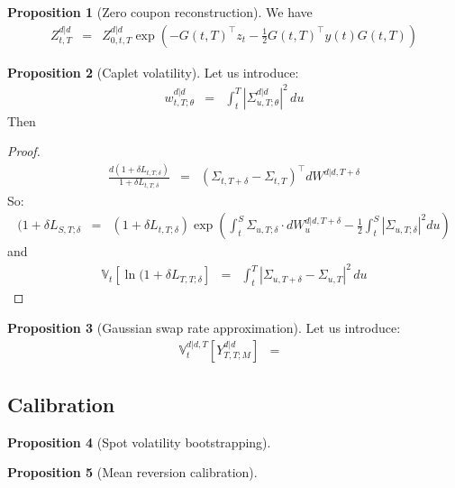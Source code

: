 \documentclass[11pt,english]{amsart}
\newcommand{\VV}{\mathbb{V}}
\theoremstyle{definition}
\newtheorem{prop}{Proposition}
\begin{document}
\begin{prop}[Zero coupon reconstruction]
We have
\begin{eqnarray}
	Z^{d|d}_{t,T} &=& Z^{d|d}_{0,t,T} \exp\left( - G(t,T)^\top z_t - \frac{1}{2} G(t,T)^\top y(t) G(t,T) \right)
\end{eqnarray}
\end{prop}

\begin{prop}[Caplet volatility]
Let us introduce:
\begin{eqnarray}
  w^{d|d}_{t,T;\theta} &=& \int_t^T \left| \Sigma^{d|d}_{u,T;\theta}  \right|^2\, du
\end{eqnarray}
Then 
\end{prop}

\begin{proof}
\begin{eqnarray}
	\frac{d(1+\delta L_{t,T;\delta})}{1+\delta L_{t,T;\delta}} 
	&=& \left( \Sigma_{t,T+\delta} - \Sigma_{t,T} \right)^\top dW^{d|d,T+\delta} 
\end{eqnarray}
So:
\begin{eqnarray}
  (1+\delta L_{S,T;\delta} 
  &=& (1+\delta L_{t,T;\delta})\exp\left( \int_t^S   \Sigma_{u,T;\delta} \cdot  dW^{d|d,T+\delta}_u  - \frac{1}{2} \int_t^S \left| \Sigma_{u,T;\delta}  \right|^2 du \right) 
\end{eqnarray}
and 
\begin{eqnarray}
  \VV_t\left[\ln(1+\delta L_{T,T;\delta}\right] &=&  \int_t^T \left| \Sigma_{u,T+\delta} - \Sigma_{u,T} \right|^2\, du 
\end{eqnarray}
\end{proof}

\begin{prop}[Gaussian swap rate approximation]
Let us introduce:
\begin{eqnarray}
	\VV^{d|d,T}_t[Y^{d|d}_{T,T;M}] &=& 
\end{eqnarray}
\end{prop}


\subsection{Calibration} 


\begin{prop}[Spot volatility bootstrapping]

\end{prop}


\begin{prop}[Mean reversion calibration]

\end{prop}
\end{document}
